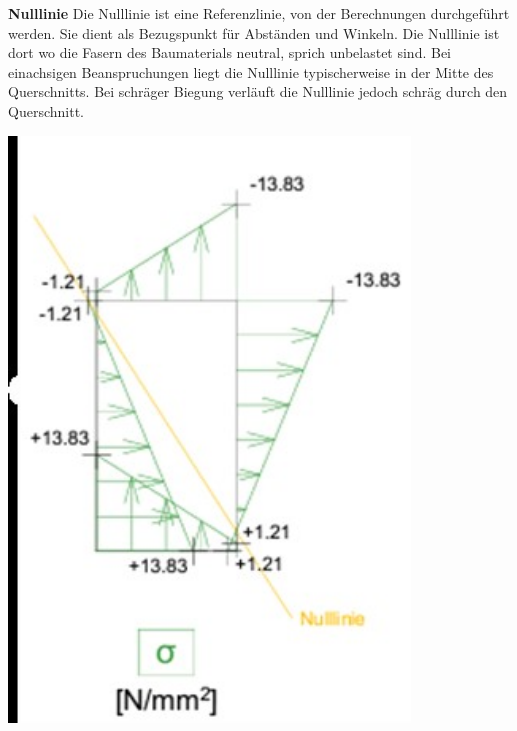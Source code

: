 \textbf{Nulllinie}
Die Nulllinie ist eine Referenzlinie, von der Berechnungen durchgeführt werden. Sie dient als Bezugspunkt für Abständen und Winkeln.
Die Nulllinie ist dort wo die Fasern des Baumaterials neutral, sprich unbelastet sind.
Bei einachsigen Beanspruchungen liegt die Nulllinie typischerweise in der Mitte des Querschnitts.
Bei schräger Biegung verläuft die Nulllinie jedoch schräg durch den Querschnitt.
\begin{center}
	\includegraphics[width=0.8\textwidth]{papers/balken/images/teil1/Nulllinie1.jpg}
\end{center}
\label{Die Abbildung zeigt den Spannungsverlauf und die Nullinie bei einer zweiaxialen Beanspruchung eines rechteckigen Querschnitts.}
